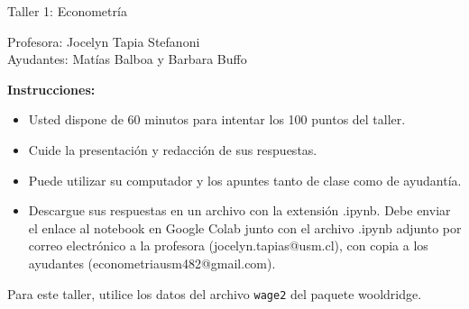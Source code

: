 \documentclass[letterpaper,11pt]{article}
\begin{document}
\begin{center}
    {\Large  Taller 1: Econometría }

Profesora:    Jocelyn Tapia Stefanoni\\
Ayudantes:   Matías Balboa y   Barbara Buffo
\end{center}

\textbf{Instrucciones:} 

\begin{itemize}
    \item Usted dispone de 60 minutos  para intentar los 100 puntos del taller.
    \item Cuide la presentación y redacción de sus respuestas.
    \item Puede utilizar su computador y los apuntes tanto de clase como de ayudantía.
\item Descargue sus respuestas en un archivo con la extensión .ipynb. Debe enviar el enlace al notebook en Google Colab junto con el archivo .ipynb adjunto por correo electrónico a la profesora (jocelyn.tapias@usm.cl), con copia a los ayudantes (econometriausm482@gmail.com). 
    \end{itemize}

Para este taller, utilice los datos del archivo \texttt{wage2} del paquete wooldridge. 
\end{document}
